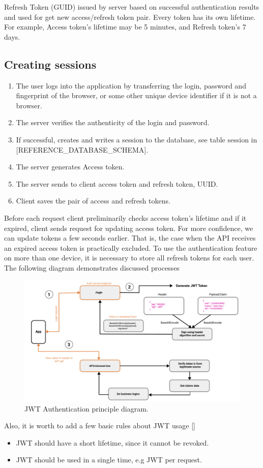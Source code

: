 Refresh Token (GUID) issued by server based on successful authentication results and used for get new access/refresh
token pair.
Every token has its own lifetime.
For example, Access token's lifetime may be 5 minutes, and Refresh token's 7 days.

\subsection{Creating sessions}\label{subsec:creating-sessions}

\begin{enumerate}
    \item The user logs into the application by transferring the login, password and fingerprint of the browser,
    or some other unique device identifier if it is not a browser.
    \item The server verifies the authenticity of the login and password.
    \item If successful, creates and writes a session to the database, see table session in
    [REFERENCE\_DATABASE\_SCHEMA].
    \item The server generates Access token.
    \item The server sends to client access token and refresh token, UUID\@.
    \item Client saves the pair of access and refresh tokens.
\end{enumerate}

Before each request client preliminarily checks access token's lifetime and if it expired, client sends request for
updating access token.
For more confidence, we can update tokens a few seconds earlier.
That is, the case when the API receives an expired access token is practically excluded.
To use the authentication feature on more than one device, it is necessary to store all refresh tokens for each user.
The following diagram demonstrates discussed processes

\begin{figure}[H]
    \centering
    \includegraphics[width=1\textwidth]{Pictures/jwt_auth_scheme.pdf}
    \caption{JWT Authentication principle diagram.}\label{fig:figure3}
\end{figure}

Also, it is worth to add a few basic rules about JWT usage [\cite{RDegges}]
\begin{itemize}
    \item JWT should have a short lifetime, since it cannot be revoked.
    \item JWT should be used in a single time, e.g JWT per request.
\end{itemize}